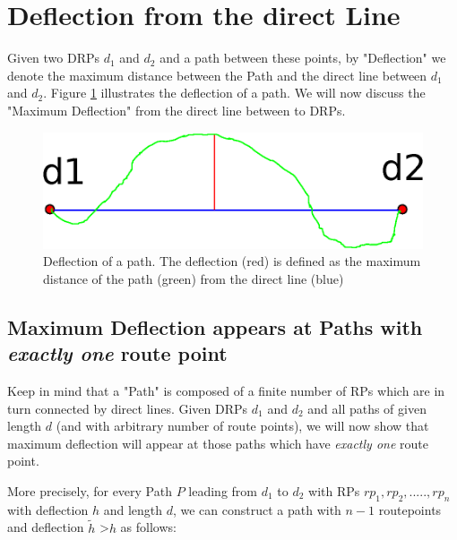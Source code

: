 \section{Deflection from the direct Line}
Given two DRPs $d_1$ and $d_2$  and a path between these points,
by "Deflection" we denote the maximum distance between the Path and the direct line between $d_1$ and $d_2$.
Figure \ref{pic:deflectionDefinition} illustrates the deflection of a path.
We will now discuss the "Maximum Deflection" from the direct line between to DRPs.
\begin{figure}[t]
\includegraphics[scale=0.5]{images/03.01.deflection.eps}
\caption{Deflection of a path. The deflection (red) is defined as the maximum distance of the path (green) from the direct line (blue)}
\label{pic:deflectionDefinition} 
\end{figure}

\subsection{Maximum Deflection appears at Paths with \emph{exactly one} route point}
\label{Pathconstruction}

Keep in mind that a "Path" is composed of a finite number of RPs which are in turn connected by direct lines.
Given DRPs $d_1$ and $d_2$ and all paths of given length $d$ (and with arbitrary number of route points), 
we will now show that maximum deflection will appear at those paths which
have \emph{exactly one} route point.

More precisely, for every Path $P$ leading from $d_1$ to $d_2$ with RPs $rp_1,rp_2,.....,rp_n$ with deflection $h$ and length $d$, 
we can construct a path with $n-1$ routepoints and deflection $\tilde{h}$ \textgreater $h$ as follows:


